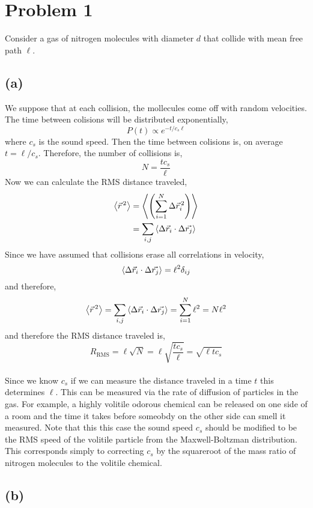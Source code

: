 \documentclass[12pt]{article}
\begin{document}
\newcommand{\lambdabar}{{\mkern0.75mu\mathchar '26\mkern -9.75mu\lambda}}


\section{Problem 1}

Consider a gas of nitrogen molecules with diameter $d$ that collide with mean free path $\ell$. 
\subsection*{(a)}

We suppose that at each collision, the mollecules come off with random velocities. The time between colisions will be distributed exponentially,
\[ P(t) \propto e^{-t/c_s \ell} \]
where $c_s$ is the sound speed. Then the time between colisions is, on average $t = \ell/c_s$. Therefore, the number of collisions is,
\[ N = \frac{t c_s}{\ell} \]
Now we can calculate the RMS distance traveled,
\begin{align*}
\left< \vec{r}^{\, 2} \right> & = \left< \left( \sum_{i = 1}^N \Delta \vec{r}_i^{\, 2} \right) \right>
\\
& = \sum_{i,j} \left< \Delta \vec{r}_i \cdot \Delta \vec{r_j} \right>
\end{align*}
Since we have assumed that collisions erase all correlations in velocity,
\[ \left< \Delta \vec{r}_i \cdot \Delta \vec{r_j} \right> = \ell^2 \delta_{ij} \]
and therefore,
\[ \left< \vec{r}^{\, 2} \right> = \sum_{i,j} \left< \Delta \vec{r}_i \cdot \Delta \vec{r_j} \right> = \sum_{i = 1}^N \ell^2 = N \ell^2 \]
and therefore the RMS distance traveled is,
\[ R_{\text{RMS}} = \ell \sqrt{N} = \ell \sqrt{\frac{t c_s}{\ell}} = \sqrt{\ell t c_s} \]
\bigskip\\
Since we know $c_s$ if we can measure the distance traveled in a time $t$ this determines $\ell$. This can be measured via the rate of diffusion of particles in the gas. For example, a highly volitile odorous chemical can be released on one side of a room and the time it takes before someobdy on the other side can smell it measured. Note that this this case the sound speed $c_s$ should be modified to be the RMS speed of the volitile particle from the Maxwell-Boltzman distribution. This corresponds simply to correcting $c_s$ by the squareroot of the mass ratio of nitrogen molecules to the volitile chemical. 


\subsection*{(b)}
\end{document}
